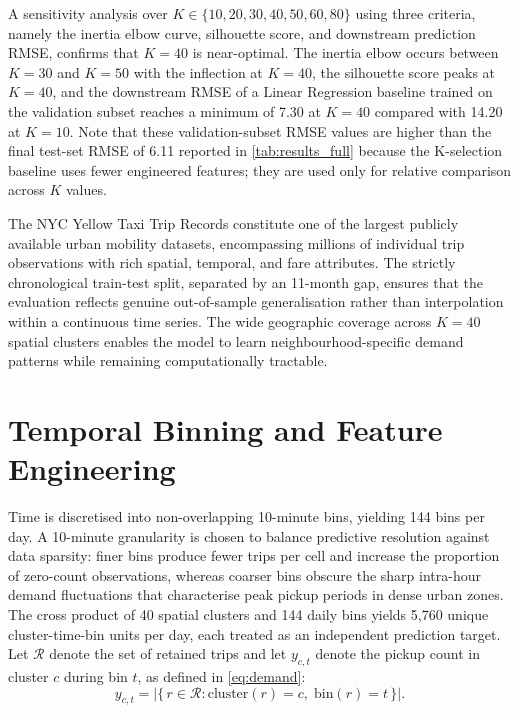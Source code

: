 A sensitivity analysis over $K \in \{10, 20, 30, 40, 50, 60, 80\}$ using three criteria, namely the inertia elbow curve, silhouette score, and downstream prediction RMSE, confirms that $K = 40$ is near-optimal. The inertia elbow occurs between $K=30$ and $K=50$ with the inflection at $K=40$, the silhouette score peaks at $K=40$, and the downstream RMSE of a Linear Regression baseline trained on the validation subset reaches a minimum of 7.30 at $K=40$ compared with 14.20 at $K=10$. Note that these validation-subset RMSE values are higher than the final test-set RMSE of 6.11 reported in \autoref{tab:results_full} because the K-selection baseline uses fewer engineered features; they are used only for relative comparison across $K$ values.

The NYC Yellow Taxi Trip Records constitute one of the largest publicly available urban mobility datasets, encompassing millions of individual trip observations with rich spatial, temporal, and fare attributes. The strictly chronological train-test split, separated by an 11-month gap, ensures that the evaluation reflects genuine out-of-sample generalisation rather than interpolation within a continuous time series. The wide geographic coverage across $K{=}40$ spatial clusters enables the model to learn neighbourhood-specific demand patterns while remaining computationally tractable.

\section{Temporal Binning and Feature Engineering}

Time is discretised into non-overlapping 10-minute bins, yielding 144 bins per day. A 10-minute granularity is chosen to balance predictive resolution against data sparsity: finer bins produce fewer trips per cell and increase the proportion of zero-count observations, whereas coarser bins obscure the sharp intra-hour demand fluctuations that characterise peak pickup periods in dense urban zones. The cross product of 40 spatial clusters and 144 daily bins yields 5,760 unique cluster-time-bin units per day, each treated as an independent prediction target. Let $\mathcal{R}$ denote the set of retained trips and let $y_{c,t}$ denote the pickup count in cluster $c$ during bin $t$, as defined in \eqref{eq:demand}:
\begin{equation}
 y_{c,t} = \bigl|\{\, r \in \mathcal{R}: \mathrm{cluster}(r)=c,\; \mathrm{bin}(r)=t \,\}\bigr|.
 \label{eq:demand}
\end{equation}

